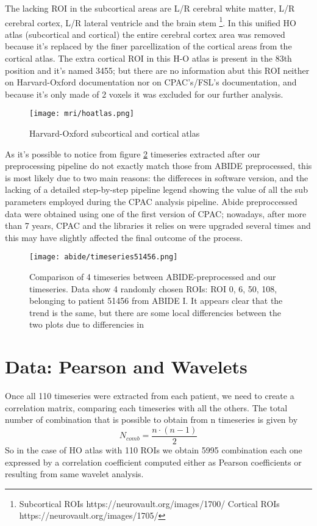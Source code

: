 \documentclass[a4paper,11pt]{article}
\begin{document}
The lacking ROI in the subcortical areas are L/R cerebral white matter, L/R cerebral cortex, L/R lateral ventricle and the brain stem \footnote{Subcortical ROIs https://neurovault.org/images/1700/ \quad Cortical ROIs https://neurovault.org/images/1705/ }.
In this unified HO atlas (subcortical and cortical) the entire cerebral cortex area was removed because it's replaced by the finer parcellization of the cortical areas from the cortical atlas.
The extra cortical ROI in this H-O atlas is present in the 83th position and it's named 3455; but there are no information abut this ROI neither on Harvard-Oxford documentation nor on CPAC's/FSL's documentation, and because it's only made of 2 voxels it was excluded for our further analysis.

\begin{figure}[h]
\centering
\texttt{[image: mri/hoatlas.png]}
\caption{Harvard-Oxford subcortical and cortical atlas}
\label{fig:hoatlas}
\end{figure}


As it's possible to notice from figure \ref{fig:confrontoabidepreproc} timeseries extracted after our preprocessing pipeline do not exactly match those from ABIDE preprocessed, this is most likely due to two main reasons: the differeces in software version, and the lacking of a detailed step-by-step pipeline legend showing the value of all the sub parameters employed during the CPAC analysis pipeline.
Abide preproccessed data were obtained using one of the first version of CPAC; nowadays, after more than 7 years, CPAC and the libraries it relies on were upgraded several times and this may have slightly affected the final outcome of the process.

\begin{figure}[h]
\centering
\texttt{[image: abide/timeseries51456.png]}
\caption{Comparison of 4 timeseries between ABIDE-preprocessed and our timeseries. Data show 4 randomly chosen ROIs: ROI 0, 6, 50, 108, belonging to patient 51456 from ABIDE I.
It appears clear that the trend is the same, but there are some local differencies between the two plots due to differencies in }
\label{fig:confrontoabidepreproc}
\end{figure}




\section{Data: Pearson and Wavelets}
Once all 110 timeseries were extracted from each patient, we need to create a correlation matrix, comparing each timeseries with all the others.
The total number of combination that is possible to obtain from n timeseries is given by
\begin{equation}
N_{comb} = \frac{n\cdot(n-1)}{2}
\end{equation}
So in the case of HO atlas with 110 ROIs we obtain 5995 combination each one expressed by a correlation coefficient computed either as Pearson coefficients or resulting from same wavelet analysis.
\end{document}
